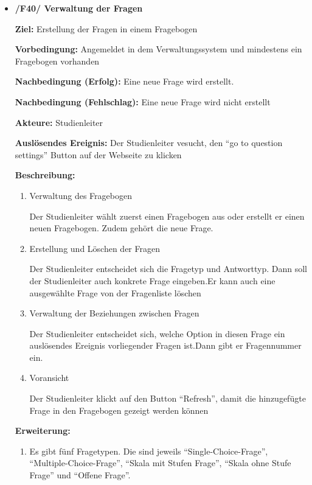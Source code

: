 \documentclass[a4paper]{scrreprt}
\begin{document}
\begin{itemize}
                \item \textbf{/F40/ Verwaltung der Fragen }
                \par \textbf{Ziel: }Erstellung der Fragen in einem Fragebogen
                \par \textbf{Vorbedingung: } Angemeldet in dem Verwaltungssystem und mindestens ein Fragebogen vorhanden
                \par \textbf{Nachbedingung (Erfolg): }Eine neue Frage wird erstellt.
                \par \textbf{Nachbedingung (Fehlschlag): }Eine neue Frage wird nicht erstellt
                \par \textbf{Akteure: }\gls{Studienleiter}
                \par \textbf{Auslösendes Ereignis: }Der \gls{Studienleiter} vesucht, den ``go to question settings'' Button auf der Webseite zu klicken
                \par \textbf{Beschreibung: }
                \begin{enumerate}
                    \item Verwaltung des Fragebogen
                    \par Der \gls{Studienleiter} wählt zuerst einen Fragebogen aus oder erstellt er einen neuen Fragebogen. Zudem gehört die neue Frage.
                    \item Erstellung und Löschen der Fragen
                    \par Der \gls{Studienleiter} entscheidet sich die Fragetyp und Antworttyp. Dann soll der \gls{Studienleiter} auch konkrete Frage eingeben.Er kann auch eine ausgewählte Frage von der Fragenliste löschen
                    \item Verwaltung der Beziehungen zwischen Fragen
                    \par Der \gls{Studienleiter} entscheidet sich, welche Option in diesen Frage ein auslösendes Ereignis vorliegender Fragen ist.Dann gibt er Fragennummer ein.
                    \item Voransicht
                    \par Der \gls{Studienleiter} klickt auf den Button ``Refresh'', damit die hinzugefügte Frage in den Fragebogen gezeigt werden können
                \end{enumerate}
                \par \textbf{Erweiterung: }
                \begin{enumerate}
                    \item Es gibt fünf Fragetypen. Die sind jeweils ``Single-Choice-Frage'', ``Multiple-Choice-Frage'', ``Skala mit Stufen Frage'', ``Skala ohne Stufe Frage'' und ``Offene Frage''.

\end{enumerate}
\end{itemize}
\end{document}
